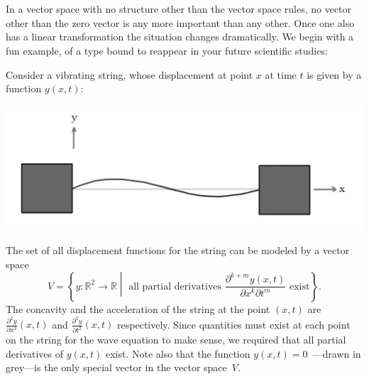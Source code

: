 

\chapter{\eigenTitle}
\label{eigenvalseigenvects}

In a vector space with no structure other than the vector space rules, no vector other than the zero vector  is any  more important than any other.
Once one also has a linear transformation the situation changes dramatically. We begin with a fun example, of a type bound to reappear in your future scientific studies:

\begin{example}

Consider a vibrating string, 
whose displacement at point $x$ at time $t$ is given by a function $y(x,t)$:
\begin{center}
\includegraphics[alt={A string connecting two boxes.  x gives the horizontal position; y gives teh vertical displacement at that position.},scale=.3]{string.jpg}
\end{center}
The set of all displacement functions for the string 
can be modeled by 
a vector space 
\[V=\left\{ y:\mathbb{R}^2 \to \mathbb{R} \middle| \text{ all partial derivatives } \frac{\partial^{k+m}y(x,t)}{\partial x^k\partial t^m} \text{ exist}\right\}.\] 
 The concavity and 
 the acceleration of the string at the point $(x,t)$ are 
 $\frac{\partial^2y}{\partial x^2}(x,t)$ and $\frac{\partial^2y}{\partial t^2}(x,t)$ respectively. 
 Since quantities must exist at each point on the string for the wave equation to make sense, 
 we required that all partial derivatives of $y(x,t)$ exist.
 Note also that the function $y(x,t)=0$~---drawn in grey---is the only special vector in the vector space~$V$. 


\end{example}

